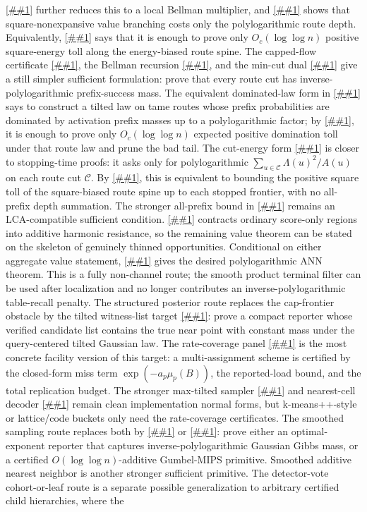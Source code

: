 \documentclass[10pt]{article}
\newcommand{\cref}[1]{\ref{##1}}
\newcommand{\Cref}[1]{\ref{##1}}
\theoremstyle{definition}
\begin{document}
\Cref{lem:local-lca-energy} further reduces this to a local Bellman multiplier, and \cref{cor:square-nonexpansive-routes} shows that square-nonexpansive value branching costs only the polylogarithmic route depth. Equivalently, \cref{lem:energy-spine-toll} says that it is enough to prove only $O_c(\log\log n)$ positive square-energy toll along the energy-biased route spine. The capped-flow certificate \cref{lem:unit-capped-value-flow}, the Bellman recursion \cref{lem:saturated-value-recursion}, and the min-cut dual \cref{lem:saturated-value-mincut} give a still simpler sufficient formulation: prove that every route cut has inverse-polylogarithmic prefix-success mass. The equivalent dominated-law form in \cref{lem:dominated-route-law} says to construct a tilted law on tame routes whose prefix probabilities are dominated by activation prefix masses up to a polylogarithmic factor; by \cref{cor:typical-route-law-toll}, it is enough to prove only $O_c(\log\log n)$ expected positive domination toll under that route law and prune the bad tail. The cut-energy form \cref{lem:cut-energy-route-law} is closer to stopping-time proofs: it asks only for polylogarithmic $\sum_{u\in\mathcal C}\Lambda(u)^2/A(u)$ on each route cut $\mathcal C$. By \cref{lem:frontier-square-toll}, this is equivalent to bounding the positive square toll of the square-biased route spine up to each stopped frontier, with no all-prefix depth summation. The stronger all-prefix bound in \cref{cor:route-law-prefix-energy} remains an LCA-compatible sufficient condition. \Cref{lem:unit-success-skeleton-contraction} contracts ordinary score-only regions into additive harmonic resistance, so the remaining value theorem can be stated on the skeleton of genuinely thinned opportunities. Conditional on either aggregate value statement, \cref{prop:budget-thinned-polylog} gives the desired polylogarithmic ANN theorem. This is a fully non-channel route; the smooth product terminal filter can be used after localization and no longer contributes an inverse-polylogarithmic table-recall penalty. The structured posterior route replaces the cap-frontier obstacle by the tilted witness-list target \cref{asm:smoothed-witness-list}: prove a compact reporter whose verified candidate list contains the true near point with constant mass under the query-centered tilted Gaussian law. The rate-coverage panel \cref{asm:rate-coverage-panel} is the most concrete facility version of this target: a multi-assignment scheme is certified by the closed-form miss term \(\exp(-a_p\mu_p(B))\), the reported-load bound, and the total replication budget. The stronger max-tilted sampler \cref{asm:alpha-leader-sampler} and nearest-cell decoder \cref{asm:smoothed-nearest-cell} remain clean implementation normal forms, but k-means++-style or lattice/code buckets only need the rate-coverage certificates. The smoothed sampling route replaces both by \cref{asm:smoothed-gibbs} or \cref{asm:gumbel-mips}: prove either an optimal-exponent reporter that captures inverse-polylogarithmic Gaussian Gibbs mass, or a certified $O(\log\log n)$-additive Gumbel-MIPS primitive. Smoothed additive nearest neighbor is another stronger sufficient primitive. The detector-vote cohort-or-leaf route is a separate possible generalization to arbitrary certified child hierarchies, where the 
\end{document}

